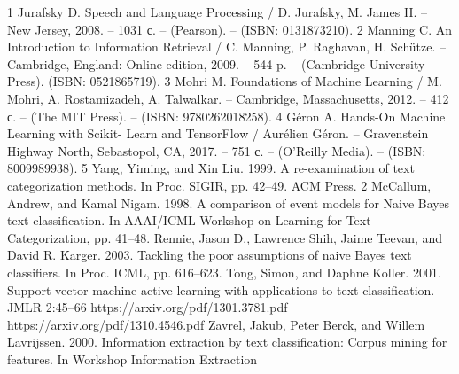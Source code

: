 \clearpage                                  %
{}	%
\insertbiblioother                          %


\begin{thebibliography}
	{1} 
	 Jurafsky D. Speech and Language Processing / D. Jurafsky, M. James   H. – New Jersey, 2008. – 1031 с. – (Pearson). – (ISBN: 0131873210). 
	 {2}
	  Manning C. An Introduction to Information Retrieval / C. Manning, P. Raghavan, H. Schütze. – Cambridge, England: Online edition, 2009. – 544 p. – (Cambridge University Press).  (ISBN: 0521865719).
	 {3}
	   Mohri M. Foundations of Machine Learning / M. Mohri, A. Rostamizadeh, A. Talwalkar. – Cambridge, Massachusetts, 2012. – 412 с. – (The MIT Press). – (ISBN: 9780262018258).
	 {4}
	  Géron A. Hands-On Machine Learning with Scikit- Learn and TensorFlow / Aurélien Géron. – Gravenstein Highway North, Sebastopol, CA, 2017. – 751 с. – (O’Reilly Media). – (ISBN: 8009989938).
	 {5}
	 Yang, Yiming, and Xin Liu. 1999. A re-examination of text categorization methods.
	 In Proc. SIGIR, pp. 42–49. ACM Press. 2
	 {}
	 McCallum, Andrew, and Kamal Nigam. 1998. A comparison of event models for
	 Naive Bayes text classification. In AAAI/ICML Workshop on Learning for Text Categorization,
	 pp. 41–48.
	 {}
	 Rennie, Jason D., Lawrence Shih, Jaime Teevan, and David R. Karger. 2003. Tackling
	 the poor assumptions of naive Bayes text classifiers. In Proc. ICML, pp. 616–623.
	 {}
	  Tong, Simon, and Daphne Koller. 2001. Support vector machine active learning with
	 applications to text classification. JMLR 2:45–66
	 {}
	 https://arxiv.org/pdf/1301.3781.pdf
	 {}
	 https://arxiv.org/pdf/1310.4546.pdf
	 {}
	 Zavrel, Jakub, Peter Berck, and Willem Lavrijssen. 2000. Information extraction by text classification: Corpus mining for features. In Workshop Information Extraction

\end{thebibliography}
